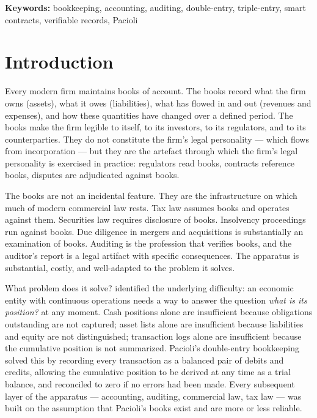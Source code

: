 \documentclass[11pt,a4paper]{article}
\theoremstyle{definition}
\theoremstyle{remark}
\begin{document}
\medskip
\noindent\textbf{Keywords:}
bookkeeping, accounting, auditing, double-entry, triple-entry,
smart contracts, verifiable records, Pacioli

\section{Introduction}
\label{sec:intro}

Every modern firm maintains books of account. The books record
what the firm owns (assets), what it owes (liabilities), what
has flowed in and out (revenues and expenses), and how these
quantities have changed over a defined period. The books make
the firm legible to itself, to its investors, to its
regulators, and to its counterparties. They do not constitute
the firm's legal personality --- which flows from
incorporation --- but they are the artefact through which the
firm's legal personality is exercised in practice: regulators
read books, contracts reference books, disputes are
adjudicated against books.

The books are not an incidental feature. They are the
infrastructure on which much of modern commercial law rests.
Tax law assumes books and operates against them. Securities
law requires disclosure of books. Insolvency proceedings run
against books. Due diligence in mergers and acquisitions is
substantially an examination of books. Auditing is the
profession that verifies books, and the auditor's report is a
legal artifact with specific consequences. The apparatus is
substantial, costly, and well-adapted to the problem it solves.

What problem does it solve? \citet{pacioli1494summa} identified
the underlying difficulty: an economic entity with continuous
operations needs a way to answer the question \emph{what is
its position?} at any moment. Cash positions alone are
insufficient because obligations outstanding are not captured;
asset lists alone are insufficient because liabilities and
equity are not distinguished; transaction logs alone are
insufficient because the cumulative position is not
summarized. Pacioli's double-entry bookkeeping solved this by
recording every transaction as a balanced pair of debits and
credits, allowing the cumulative position to be derived at any
time as a trial balance, and reconciled to zero if no errors
had been made. Every subsequent layer of the apparatus ---
accounting, auditing, commercial law, tax law --- was built on
the assumption that Pacioli's books exist and are more or less
reliable.
\end{document}
